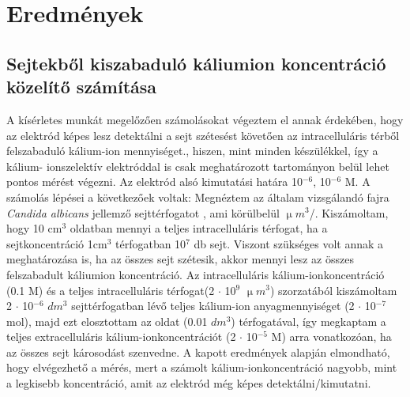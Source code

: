 \chapter{Eredmények}
\pagestyle{headings}


\section{Sejtekből kiszabaduló káliumion koncentráció közelítő számítása}
A kísérletes munkát megelőzően számolásokat végeztem el annak érdekében, hogy az elektród képes lesz detektálni a sejt szétesést követően az intracelluláris térből felszabaduló kálium-ion mennyiséget., hiszen, mint minden készülékkel, így a kálium- ionszelektív elektróddal is csak meghatározott tartományon belül lehet pontos mérést végezni. Az elektród alsó kimutatási határa 10$^{-6}$, 10$^{-6}$ M. 
 A számolás lépései a következőek voltak: 
Megnéztem az általam vizsgálandó fajra \emph{Candida albicans} jellemző sejttérfogatot \cite{chaffin1984relationship}, ami körülbelül $\upmu m^3$/. Kiszámoltam, hogy 10 cm$^3$  oldatban mennyi a teljes intracelluláris térfogat, ha a sejtkoncentráció 1cm$^3$ térfogatban 10$^7$ db sejt. Viszont szükséges volt annak a meghatározása is, ha az összes sejt szétesik, akkor mennyi lesz az összes felszabadult káliumion koncentráció. Az intracelluláris kálium-ionkoncentráció (0.1 M) és a teljes intracelluláris térfogat(2 $\cdot$ 10$^9$ $\upmu m^3$) szorzatából kiszámoltam 2 $\cdot$ 10$^{-6}$ $dm^3$ sejttérfogatban lévő teljes kálium-ion anyagmennyiséget (2 $\cdot$ 10$^{-7}$ mol), majd ezt elosztottam az oldat (0.01 $dm^3$) térfogatával, így megkaptam a teljes extracelluláris kálium-ionkoncentrációt (2 $\cdot$ 10$^{-5}$ M) arra vonatkozóan, ha az összes sejt károsodást szenvedne. A kapott eredmények alapján elmondható, hogy elvégezhető a mérés, mert a számolt kálium-ionkoncentráció nagyobb, mint a legkisebb koncentráció, amit az elektród még képes detektálni/kimutatni. 

